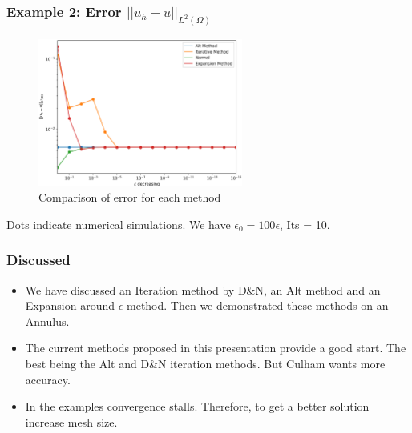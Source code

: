\documentclass{beamer}
\begin{document}
    \begin{frame}
        \frametitle{Example 2: Error $||u_h-u||_{L^2(\Omega)}$}
\begin{figure}
            \centering
            \includegraphics[width=0.6\textwidth]{Example_2_Error_Correct.png} 
            \caption{Comparison of error for each method}
        \end{figure}
    Dots indicate numerical simulations. We have $\epsilon_0 = 100\epsilon$, Its = 10.
    \end{frame}
    
   
    
    \begin{frame}
        \frametitle{Discussed}
        \begin{itemize}
        \item We have discussed an Iteration method by D\&N, an Alt method and an Expansion around $\epsilon$ method. Then we demonstrated these methods on an Annulus. 
            \item The current methods proposed in this presentation provide a good start. The best being the Alt and D\&N iteration methods. But Culham wants more accuracy.
            \item In the examples convergence stalls. Therefore, to get a better solution increase mesh size.
        \end{itemize}

    \end{frame}
    
\end{document}
